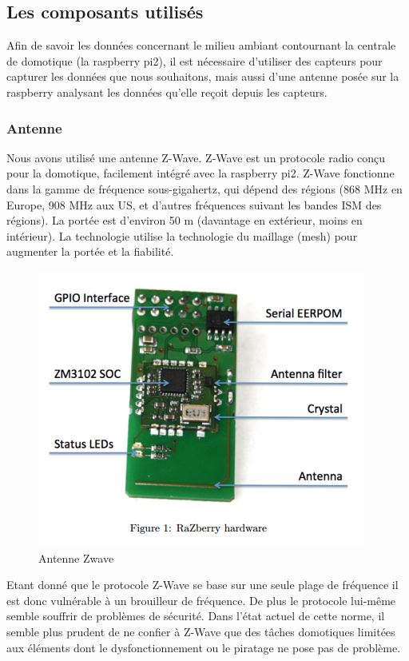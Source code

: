 \subsection{Les composants utilisés}
Afin de savoir les données concernant le milieu ambiant contournant la centrale de domotique (la raspberry pi2), il est nécessaire d'utiliser des capteurs pour capturer les données que nous souhaitons, mais aussi d'une antenne posée sur la raspberry analysant les données qu'elle reçoit depuis les capteurs.

\subsubsection{Antenne}
Nous avons utilisé une antenne Z-Wave. Z-Wave est un protocole radio conçu pour la domotique, facilement intégré avec la raspberry pi2. Z-Wave fonctionne dans la gamme de fréquence sous-gigahertz, qui dépend des régions (868 MHz en Europe, 908 MHz aux US, et d'autres fréquences suivant les bandes ISM des régions). La portée est d'environ 50 m (davantage en extérieur, moins en intérieur). La technologie utilise la technologie du maillage (mesh) pour augmenter la portée et la fiabilité.

\begin{figure}[h!]
	\center
	\includegraphics[scale=0.5]{./Images/png/Zwave.png}\newline
	\caption{Antenne Zwave}
\end{figure}

Etant donné que le protocole Z-Wave se base sur une seule plage de fréquence il est donc vulnérable à un brouilleur de fréquence.
 De plus le protocole lui-même semble souffrir de problèmes de sécurité. Dans l'état actuel de cette norme, il semble plus prudent de ne confier à Z-Wave que des tâches domotiques limitées aux éléments dont le dysfonctionnement ou le piratage ne pose pas de problème.
\clearpage
\newpage

